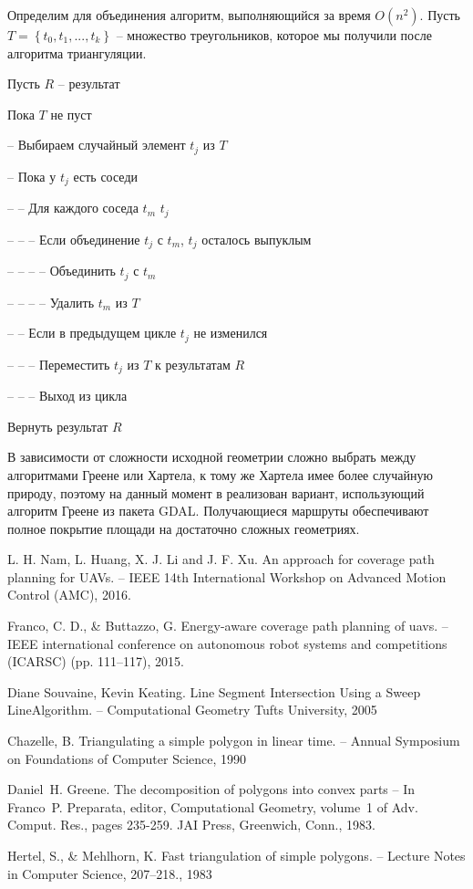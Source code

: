 Определим для объединения алгоритм, выполняющийся за время $O(n^2)$. Пусть $T=\left\lbrace t_0, t_1, ..., t_k \right\rbrace $ -- множество треугольников, которое мы получили после алгоритма триангуляции.

Пусть $R$ -- результат

Пока $T$ не пуст

-- Выбираем случайный элемент $t_j$ из $T$

-- Пока у $t_j$ есть соседи

-- -- Для каждого соседа $t_m$ $t_j$

-- -- -- Если объединение $t_j$ с $t_m$, $t_j$ осталось выпуклым

-- -- -- -- Объединить $t_j$ с $t_m$

-- -- -- -- Удалить $t_m$ из $T$

-- -- Если в предыдущем цикле $t_j$ не изменился

-- -- -- Переместить $t_j$ из $T$ к результатам $R$

-- -- -- Выход из цикла

Вернуть результат $R$


В зависимости от сложности исходной геометрии сложно выбрать между алгоритмами Греене или Хартела, к тому же Хартела имее более случайную природу, поэтому на данный момент в реализован вариант, использующий алгоритм Греене из пакета GDAL. Получающиеся маршруты обеспечивают полное покрытие площади на достаточно сложных геометриях.

\begin{thebibliography}{99}
	
	
	\re{} L. H. Nam, L. Huang, X. J. Li and J. F. Xu. An approach for coverage path planning for UAVs. -- IEEE 14th International Workshop on Advanced Motion Control (AMC), 2016.
	
	\re{} Franco, C. D., \& Buttazzo, G. Energy-aware coverage path planning of uavs. -- IEEE international conference on autonomous robot systems and competitions
	(ICARSC) (pp. 111–117), 2015.
	
	\re{} Diane Souvaine, Kevin Keating. Line Segment Intersection Using a Sweep LineAlgorithm. -- Computational Geometry Tufts University, 2005
	
	\re{} Chazelle, B. Triangulating a simple polygon in linear time. --  Annual Symposium on Foundations of Computer Science, 1990
	
	\re{} Daniel H. Greene. The decomposition of polygons into convex parts -- In Franco P. Preparata, editor, Computational Geometry, volume 1 of Adv. Comput. Res., pages 235-259. JAI Press, Greenwich, Conn., 1983.
	
	\re{} Hertel, S., \& Mehlhorn, K. Fast triangulation of simple polygons. -- Lecture Notes in Computer Science, 207–218., 1983
	
\end{thebibliography}

